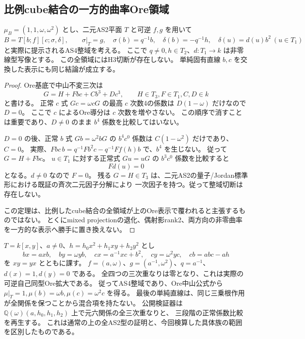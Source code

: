 \subsection{比例cube結合の一方的曲率Ore領域}
\label{subsec:cubic-third-root-unit-curved-Ore}
\begin{theorem}
\label{thm:cubic-third-root-unit-curved-Ore-empty}
$\mu_B=(1,1,\omega,\omega^2)$ とし、二元AS2平面 $T$ と可逆 $f,g$ を用いて
\[
 B=T[b;f][c;\sigma,\delta],\qquad
 \sigma|_T=g,\quad\sigma(b)=q^{-1}b,\quad
 \delta(b)=-q^{-1}h,\quad\delta(u)=d(u)b^2\ (u\in T_1)
\]
と実際に提示されるAS4整域を考える。
ここで $q\ne0,h\in T_2$、$d:T_1\to k$ は非零線型写像とする。
この全領域にはH3切断が存在しない。
単純固有直線 $b,c$ を交換した表示にも同じ結論が成立する。
\end{theorem}
\begin{proof}
Ore基底で中山不変三次は
\[
 G=H+Fbc+C b^3+D c^3,\qquad H\in T_3,F\in T_1,C,D\in k
\]
と書ける。
正常 $c$ 式 $Gc=\omega cG$ の最高 $c$ 次数4の係数は
$D(1-\omega)$ だけなので $D=0$。
ここで $c$ によるOre導分は $c$ 次数を増やさない。
この順序で消すことは重要であり、$D\ne0$ のまま $b^4$ 係数を比較してはいない。

$D=0$ の後、正常 $b$ 式 $Gb=\omega^2 bG$ の $b^4c^0$ 係数は
$C(1-\omega^2)$ だけであり、$C=0$。
実際、$Fbc\,b=q^{-1}Fb^2c-q^{-1}Ff(h)b$ で、$b^4$ を生じない。
従って $G=H+Fbc$。
$u\in T_1$ に対する正常式 $Gu=uG$ の $b^3c^0$ 係数を比較すると
\[
 Fd(u)=0
\]
となる。$d\ne0$ なので $F=0$。
残る $G=H\in T_3$ は、二元AS2の量子/Jordan標準形における既証の斉次二元因子分解により
一次因子を持つ。従って整域切断は存在しない。

この定理は、比例したcube結合の全領域が上のOre表示で覆われると主張するものではない。
とくにmixed projectionの退化、偶射影rank2、両方向の非零曲率を一方的な表示へ勝手に置き換えない。
\end{proof}

\begin{example}[全係数で検算する実際の曲率Ore族]
$T=k[x,y]$、$a\ne0$、$h=h_0x^2+h_1xy+h_2y^2$ とし
\[
 bx=axb,\quad by=\omega yb,\quad
 cx=a^{-1}xc+b^2,\quad cy=\omega^2yc,\quad
 cb=abc-ah
\]
を $xy=yx$ とともに課す。
$f=(a,\omega)$、$g=(a^{-1},\omega^2)$、$q=a^{-1}$、$d(x)=1,d(y)=0$ である。
全四つの三次重なりは零となり、これは実際の可逆自己同型Ore拡大である。
従ってAS4整域であり、Ore中山公式から
$\mu|_T=1,\mu(b)=\omega b,\mu(c)=\omega^2c$ を得る。
最後の単純直線は、同じ三乗根作用が全関係を保つことから混合項を持たない。
公開検証器は $\mathbb Q(\omega)(a,h_0,h_1,h_2)$ 上で元六関係の全三次重なりと、
三段階の正常係数比較を再生する。
これは通常の上の全AS2型の証明と、今回検算した具体族の範囲を区別したものである。
\end{example}
